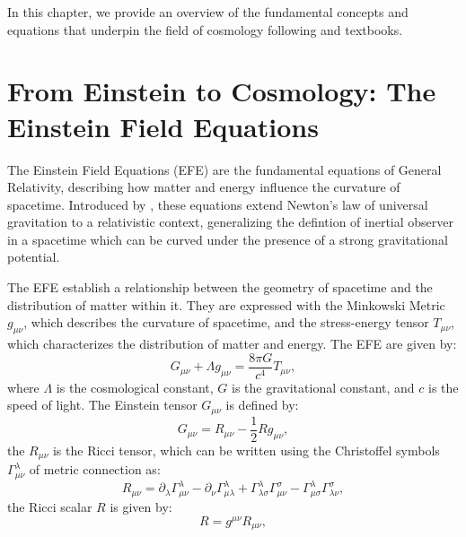 In this chapter, we provide an overview of the fundamental concepts and equations that underpin the field of cosmology following  \citet{2003moco.book.....D} and \citet{2008cosm.book.....W} textbooks.

\section[Einstein Field Equations]{From Einstein to Cosmology: The Einstein Field Equations}
The Einstein Field Equations (EFE) are the fundamental equations of General Relativity, describing how matter and energy influence the curvature of spacetime. Introduced by \citet{1915SPAW.......844E}, these equations extend Newton's law of universal gravitation to a relativistic context, generalizing the defintion of inertial observer in a spacetime which can be curved under the presence of a strong gravitational potential.

The EFE establish a relationship between the geometry of spacetime and the distribution of matter within it. They are expressed with the Minkowski Metric $g_{\mu\nu}$, which describes the curvature of spacetime, and the stress-energy tensor $T_{\mu\nu}$, which characterizes the distribution of matter and energy. The EFE are given by:
\begin{equation}
    G_{\mu\nu} + \Lambda g_{\mu\nu}= \frac{8\pi G}{c^4} T_{\mu\nu},
    \label{eq:einstein_field_equations}
\end{equation}
where $\Lambda$ is the cosmological constant, $G$ is the gravitational constant, and $c$ is the speed of light. The Einstein tensor $G_{\mu\nu}$ is defined by:
\begin{equation}
    G_{\mu\nu} = R_{\mu\nu} - \frac{1}{2} R g_{\mu\nu},
    \label{eq:einstein_tensor}
\end{equation}
the $R_{\mu\nu}$ is the Ricci tensor, which can be written using the Christoffel symbols $\Gamma^\lambda_{\mu\nu}$ of metric connection as:
\begin{equation}
    R_{\mu\nu} = \partial_\lambda \Gamma^\lambda_{\mu\nu} - \partial_\nu \Gamma^\lambda_{\mu\lambda} + \Gamma^\lambda_{\lambda\sigma} \Gamma^\sigma_{\mu\nu} - \Gamma^\lambda_{\mu\sigma} \Gamma^\sigma_{\lambda\nu},
    \label{eq:ricci_curvature_tensor}
\end{equation}
the Ricci scalar $R$ is given by:
\begin{equation}
    R = g^{\mu\nu} R_{\mu\nu},
    \label{eq:ricci_scalar}
\end{equation}

